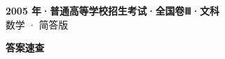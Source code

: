 \documentclass[zihao=-4, a4paper]{ctexart}
\begin{document}
\begin{center}
  {\Large\bfseries 2005 年·普通高等学校招生考试·全国卷Ⅲ·文科}\\[4pt]
  {\large 数学 · 简答版}
\end{center}
\medskip
{}

\clearpage
{}
\begin{center}{\Large\bfseries 答案速查}\end{center}
\medskip

\end{document}
